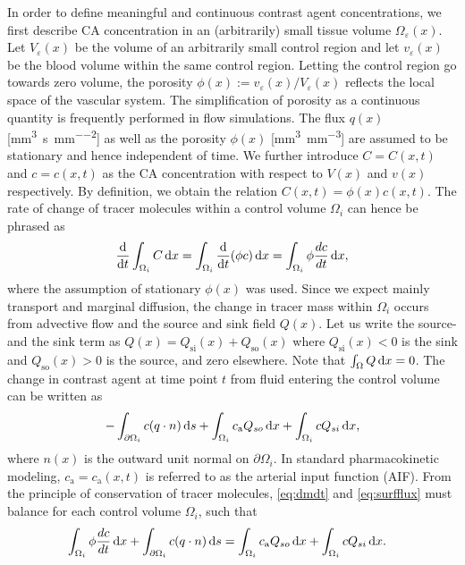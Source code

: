 \documentclass[journal,twocolumn]{IEEEtran}
\newcommand{\Qso}{Q_{\mathrm{so}}}
\newcommand{\Qsi}{Q_{\mathrm{si}}}
\newcommand{\ca}{c_\mathrm{a}}
\newcommand{\siq}{\milli\meter\cubed\per\second\per\milli\meter\squared}
\newcommand{\siphi}{\milli\meter\cubed\per\milli\meter\cubed}
\begin{document}
	In order to define meaningful and continuous contrast agent concentrations, we first describe CA concentration in an (arbitrarily) small tissue volume $\Omega_\varepsilon(x)$.
	Let $V_\varepsilon(x)$ be the volume of an arbitrarily small control region and let $v_\varepsilon(x)$ be the blood volume within the same control region.
	Letting the control region go towards zero volume, the porosity $\phi(x) := v_\varepsilon(x)/V_\varepsilon(x)$ reflects the local space of the vascular system. The simplification of porosity as a continuous quantity is frequently performed in flow simulations.
	The flux $q(x)$ [\si{\siq}] as well as the porosity $\phi(x)$ [\si{\siphi}] are assumed to be stationary and hence independent of time.	
	We further introduce $C = C(x,t)$ and $c = c(x,t)$ as the CA concentration with respect to $V(x)$ and $v(x)$ respectively.
	By definition, we obtain the relation $C(x,t) = \phi(x)  c(x,t)$.
	The rate of change of tracer molecules within a control volume $\Omega_i$ can hence be phrased as
	\begin{equation}
		\diffop{t}\int_{\Omega_i}C \diffint x = \int_{\Omega_i}\diffop{t}(\phi c) \diffint x = \int_{\Omega_i} \phi \frac{d c}{dt}\diffint x,
		\label{eq:dmdt}
	\end{equation}	
	where the assumption of stationary $\phi(x)$ was used.
	Since we expect mainly transport and marginal diffusion, the change in tracer mass within $\Omega_i$ occurs from advective flow and the source and sink field $Q(x)$.
	Let us write the source- and the sink term as $Q(x) = \Qsi(x) + \Qso(x)$ where $\Qsi(x) < 0$ is the sink and $\Qso(x) > 0$ is the source, and zero elsewhere. 
	Note that $\int_\Omega Q \,\mathrm{d} x = 0$. 
	The change in contrast agent at time point $t$ from fluid entering the control volume can be written as
	\begin{equation}
		-\int_{ \partial \Omega_i}c(q \cdot n)\diffint s + \int_{\Omega_i}\ca Q_{so} \diffint x + \int_{\Omega_i}cQ_{si} \diffint x,
		\label{eq:surfflux}
	\end{equation}
	where $n(x)$ is the outward unit normal on $\partial \Omega_i$.
	In standard pharmacokinetic modeling, $\ca = \ca(x,t)$ is referred to as the arterial input function (AIF).
	From the principle of conservation of tracer molecules, \eqref{eq:dmdt} and \eqref{eq:surfflux} must balance for each control volume $\Omega_i$, such that
	\begin{align}
		& \int_{\Omega_i} \phi \frac{d c}{dt} \diffint x + \int_{ \partial \Omega_i}c(q \cdot n) \diffint s
		 = \int_{\Omega_i}\ca Q_{so} \diffint x + \int_{\Omega_i}c Q_{si} \diffint x.
		\label{eq:conteq}
	\end{align}
\end{document}
